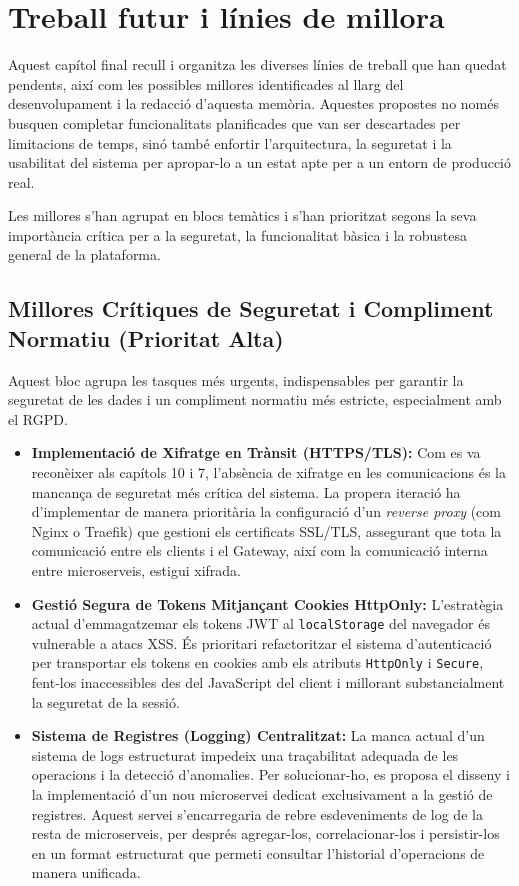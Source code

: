 \chapter{Treball futur i línies de millora}

Aquest capítol final recull i organitza les diverses línies de treball que han quedat pendents, així com les possibles millores identificades al llarg del desenvolupament i la redacció d'aquesta memòria. Aquestes propostes no només busquen completar funcionalitats planificades que van ser descartades per limitacions de temps, sinó també enfortir l'arquitectura, la seguretat i la usabilitat del sistema per apropar-lo a un estat apte per a un entorn de producció real.

Les millores s'han agrupat en blocs temàtics i s'han prioritzat segons la seva importància crítica per a la seguretat, la funcionalitat bàsica i la robustesa general de la plataforma.

\section{Millores Crítiques de Seguretat i Compliment Normatiu (Prioritat Alta)}

Aquest bloc agrupa les tasques més urgents, indispensables per garantir la seguretat de les dades i un compliment normatiu més estricte, especialment amb el RGPD.

\begin{itemize}
    \item \textbf{Implementació de Xifratge en Trànsit (HTTPS/TLS):} Com es va reconèixer als capítols 10 i 7, l'absència de xifratge en les comunicacions és la mancança de seguretat més crítica del sistema. La propera iteració ha d'implementar de manera prioritària la configuració d'un \textit{reverse proxy} (com Nginx o Traefik) que gestioni els certificats SSL/TLS, assegurant que tota la comunicació entre els clients i el Gateway, així com la comunicació interna entre microserveis, estigui xifrada.
    
    \item \textbf{Gestió Segura de Tokens Mitjançant Cookies HttpOnly:} L'estratègia actual d'emmagatzemar els tokens JWT al \texttt{localStorage} del navegador és vulnerable a atacs XSS. És prioritari refactoritzar el sistema d'autenticació per transportar els tokens en cookies amb els atributs \texttt{HttpOnly} i \texttt{Secure}, fent-los inaccessibles des del JavaScript del client i millorant substancialment la seguretat de la sessió.
    
    \item \textbf{Sistema de Registres (Logging) Centralitzat:} La manca actual d'un sistema de logs estructurat impedeix una traçabilitat adequada de les operacions i la detecció d'anomalies. Per solucionar-ho, es proposa el disseny i la implementació d'un nou microservei dedicat exclusivament a la gestió de registres. Aquest servei s'encarregaria de rebre esdeveniments de log de la resta de microserveis, per després agregar-los, correlacionar-los i persistir-los en un format estructurat que permeti consultar l'historial d'operacions de manera unificada.
\end{itemize}

